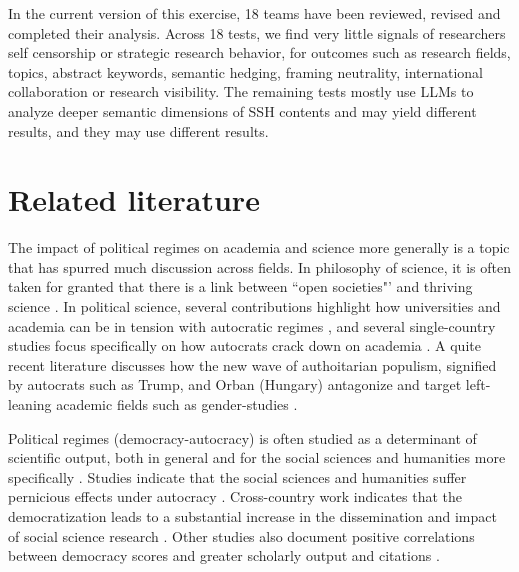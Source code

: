 \documentclass[12pt,a4paper]{article}
\begin{document}
In the current version of this exercise, 18 teams have been reviewed, revised and completed their analysis. Across 18 tests, we find very little signals of researchers self censorship or strategic research behavior, for outcomes such as research fields, topics, abstract keywords, semantic hedging, framing neutrality, international collaboration or research visibility. The remaining tests mostly use LLMs to analyze deeper semantic dimensions of SSH contents and may yield different results, and they may use different results.  

\section{Related literature}
The impact of political regimes on academia and science more generally is a topic that has spurred much discussion across fields. In philosophy of science, it is often taken for granted that there is a link between ``open societies"' and thriving science \citep{Popper1945,kitcher2001science}. In political science, several contributions highlight how universities and academia can be in tension with autocratic regimes \citep{Dahlum19,Dahlum21,WeidmannRulis2025,Apfeld2024}, and several single-country studies focus specifically on how autocrats crack down on academia  \citep{majtenyi2025,Ertem2025,Fodor21}. A quite recent literature discusses how the new wave of authoitarian populism, signified by autocrats such as Trump, and Orban (Hungary)  antagonize and target left-leaning academic fields such as gender-studies \citep{dietze2021right}.

Political regimes (democracy-autocracy) is often studied as a determinant of scientific output, both in general \citep{Wig26} and for the social sciences and humanities more specifically \citep{Tayebi2025,Whetsell2025}. Studies indicate that the social sciences and humanities suffer pernicious effects under autocracy \citep{BerggrenBjornskov2022,Tayebi2025}. Cross-country work indicates that the democratization leads to a substantial increase in the dissemination and impact of social science research \citep{Tayebi2025}. Other studies also document positive correlations between democracy scores and greater scholarly output and citations \citet{Yang2021}.
\end{document}
